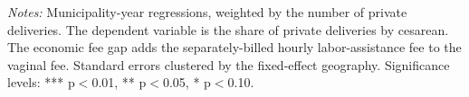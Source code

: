 \begin{table}[H]
{
}
   
   \par \raggedright 
   \footnotesize\textit{Notes:} Municipality-year regressions, weighted by the number of private deliveries. The dependent variable is the share of private deliveries by cesarean. The economic fee gap adds the separately-billed hourly labor-assistance fee to the vaginal fee. Standard errors clustered by the fixed-effect geography. \footnotesize Significance levels: *** p$<$0.01, ** p$<$0.05, * p$<$0.10.
\end{table}


